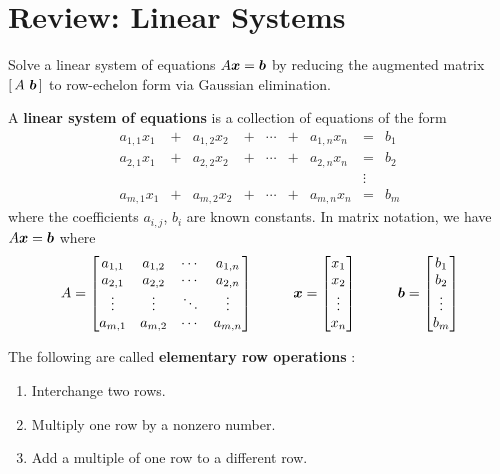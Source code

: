 \section{Review: Linear Systems}

\begin{bigidea}
Solve a linear system of equations $A \boldsymbol{x} = \boldsymbol{b}$ by reducing the augmented matrix $[ \, A \ \boldsymbol{b} \, ]$ to row-echelon form via Gaussian elimination.
\end{bigidea}

\begin{definition}
A {\bf linear system of equations} \cite[p.1]{KN} is a collection of equations of the form
$$
\begin{array}{ccccccccc}
a_{1,1} x_1 & + & a_{1,2} x_2 & + & \cdots & + & a_{1,n} x_n & = & b_1 \\
a_{2,1} x_1 & + & a_{2,2} x_2 & + & \cdots & + & a_{2,n} x_n & = & b_2 \\
& & & & & & & \vdots & \\
a_{m,1} x_1 & + & a_{m,2} x_2 & + & \cdots & + & a_{m,n} x_n & = & b_m
\end{array}
$$
where the coefficients $a_{i,j}$, $b_i$ are known constants. In matrix notation, we have $A \boldsymbol{x} = \boldsymbol{b}$ where
$$
A = 
\begin{bmatrix}
a_{1,1} & a_{1,2} & \cdots & a_{1,n} \\
a_{2,1} & a_{2,2} & \cdots & a_{2,n} \\
\vdots & \vdots & \ddots & \vdots \\
a_{m,1} & a_{m,2} & \cdots & a_{m,n}
\end{bmatrix}
\hspace{10mm}
\bs{x} = \begin{bmatrix} x_1 \\ x_2 \\ \vdots \\ x_n \end{bmatrix}
\hspace{10mm}
\bs{b} = \begin{bmatrix} b_1 \\ b_2 \\ \vdots \\ b_m \end{bmatrix}
$$
\end{definition}

\begin{definition}
The following are called {\bf elementary row operations} \cite[p.5]{KN}:
\begin{enumerate}
\item Interchange two rows.
\item Multiply one row by a nonzero number.
\item Add a multiple of one row to a different row.
\end{enumerate}
\end{definition}

